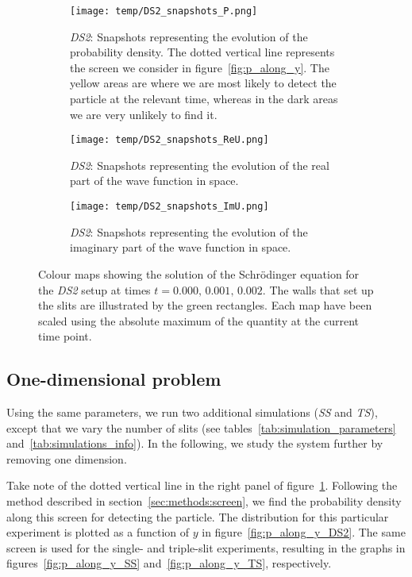     \begin{figure*}
        \centering
        \begin{subfigure}{0.96\textwidth}
            \texttt{[image: temp/DS2\_snapshots\_P.png]}
            \caption{\textit{DS2}: Snapshots representing the evolution of the probability density. The dotted vertical line represents the screen we consider in figure~\ref{fig:p_along_y}. The yellow areas are where we are most likely to detect the particle at the relevant time, whereas in the dark areas we are very unlikely to find it.}
            \label{fig:snapshots_p_DS2}
        \end{subfigure}
        \hfill
        \begin{subfigure}{0.96\textwidth}
            \texttt{[image: temp/DS2\_snapshots\_ReU.png]}
            \caption{\textit{DS2}: Snapshots representing the evolution of the real part of the wave function in space. }
            \label{fig:snapshots_ReU_DS2}
        \end{subfigure}
        \hfill
        \begin{subfigure}{0.96\textwidth}
            \texttt{[image: temp/DS2\_snapshots\_ImU.png]}
            \caption{\textit{DS2}: Snapshots representing the evolution of the imaginary part of the wave function in space.}
            \label{fig:snapshots_ImU_DS2}
        \end{subfigure}
        \caption{Colour maps showing the solution of the Schrödinger equation for the \textit{DS2} setup at times $t=0.000,\, 0.001, \,0.002$. The walls that set up the slits are illustrated by the green rectangles. Each map have been scaled using the absolute maximum of the quantity at the current time point. }
        \label{fig:snapshots_DS2}
    \end{figure*}




\subsection{One-dimensional problem}

    Using the same parameters, we run two additional simulations (\textit{SS} and \textit{TS}), except that we vary the number of slits (see tables~\ref{tab:simulation_parameters} and~\ref{tab:simulations_info}). In the following, we study the system further by removing one dimension.

    Take note of the dotted vertical line in the right panel of figure~\ref{fig:snapshots_p_DS2}. Following the method described in section~\ref{sec:methods:screen}, we find the probability density along this screen for detecting the particle.  The distribution for this particular experiment is plotted as a function of $y$ in figure~\ref{fig:p_along_y_DS2}. The same screen is used for the single- and triple-slit experiments, resulting in the graphs in figures~\ref{fig:p_along_y_SS} and~\ref{fig:p_along_y_TS}, respectively. %

